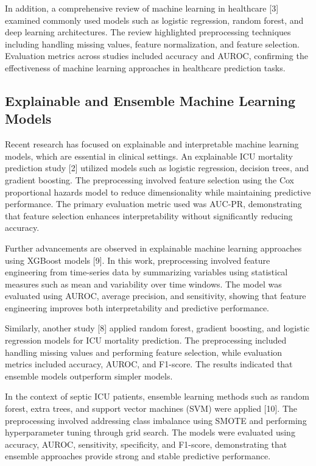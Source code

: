 \documentclass[11pt]{article}
\begin{document}
In addition, a comprehensive review of machine learning in healthcare [3] examined commonly used models such as logistic regression, random forest, and deep learning architectures. The review highlighted preprocessing techniques including handling missing values, feature normalization, and feature selection. Evaluation metrics across studies included accuracy and AUROC, confirming the effectiveness of machine learning approaches in healthcare prediction tasks.



 

\subsection{Explainable and Ensemble Machine Learning Models
}
Recent research has focused on explainable and interpretable machine learning models, which are essential in clinical settings. An explainable ICU mortality prediction study [2] utilized models such as logistic regression, decision trees, and gradient boosting. The preprocessing involved feature selection using the Cox proportional hazards model to reduce dimensionality while maintaining predictive performance. The primary evaluation metric used was AUC-PR, demonstrating that feature selection enhances interpretability without significantly reducing accuracy.

Further advancements are observed in explainable machine learning approaches using XGBoost models [9]. In this work, preprocessing involved feature engineering from time-series data by summarizing variables using statistical measures such as mean and variability over time windows. The model was evaluated using AUROC, average precision, and sensitivity, showing that feature engineering improves both interpretability and predictive performance.

Similarly, another study [8] applied random forest, gradient boosting, and logistic regression models for ICU mortality prediction. The preprocessing included handling missing values and performing feature selection, while evaluation metrics included accuracy, AUROC, and F1-score. The results indicated that ensemble models outperform simpler models.

In the context of septic ICU patients, ensemble learning methods such as random forest, extra trees, and support vector machines (SVM) were applied [10]. The preprocessing involved addressing class imbalance using SMOTE and performing hyperparameter tuning through grid search. The models were evaluated using accuracy, AUROC, sensitivity, specificity, and F1-score, demonstrating that ensemble approaches provide strong and stable predictive performance.
\end{document}

